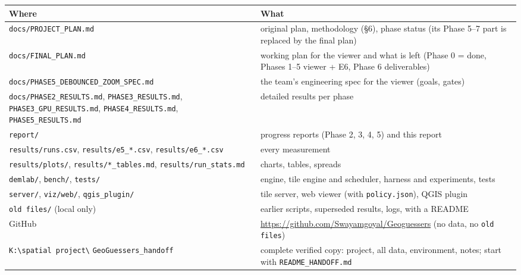﻿\documentclass[11pt,a4paper]{article}
\newcommand{\code}[1]{\texttt{#1}}
\begin{document}
{\small
\begin{longtable}{>{\raggedright\arraybackslash}p{7.6cm}>{\raggedright\arraybackslash}p{7.8cm}}
\toprule
Where & What \\
\midrule
\endhead
\code{docs/PROJECT\_PLAN.md} & original plan, methodology (\S6), phase status (its Phase 5--7 part is replaced by the final plan) \\
\code{docs/FINAL\_PLAN.md} & working plan for the viewer and what is left (Phase 0 = done, Phases 1--5 viewer + E6, Phase 6 deliverables) \\
\code{docs/PHASE5\_DEBOUNCED\_\allowbreak ZOOM\_SPEC.md} & the team's engineering spec for the viewer (goals, gates) \\
\code{docs/PHASE2\_RESULTS.md}, \code{PHASE3\_RESULTS.md}, \code{PHASE3\_GPU\_RESULTS.md}, \code{PHASE4\_RESULTS.md}, \code{PHASE5\_RESULTS.md} & detailed results per phase \\
\code{report/} & progress reports (Phase 2, 3, 4, 5) and this report \\
\code{results/runs.csv}, \code{results/e5\_*.csv}, \code{results/e6\_*.csv} & every measurement \\
\code{results/plots/}, \code{results/*\_tables.md}, \code{results/run\_stats.md} & charts, tables, spreads \\
\code{demlab/}, \code{bench/}, \code{tests/} & engine, tile engine and scheduler, harness and experiments, tests \\
\code{server/}, \code{viz/web/}, \code{qgis\_plugin/} & tile server, web viewer (with \code{policy.json}), QGIS plugin \\
\code{old files/} (local only) & earlier scripts, superseded results, logs, with a README \\
GitHub & \url{https://github.com/Swayamgoyal/Geoguessers} (no data, no \code{old files}) \\
\code{K:\textbackslash spatial project\textbackslash} \code{GeoGuessers\_handoff} & complete verified copy: project, all data,
environment, notes; start with \code{README\_HANDOFF.md} \\
\bottomrule
\end{longtable}
}
\end{document}
